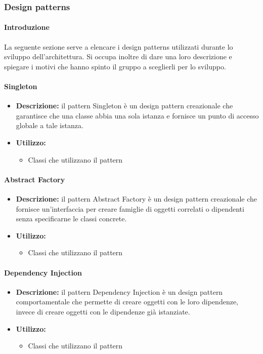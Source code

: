 \subsubsection{Design patterns}
\paragraph{Introduzione}
\par La seguente sezione serve a elencare i design patterns utilizzati durante lo sviluppo dell'architettura. Si occupa inoltre di dare una loro descrizione e spiegare i motivi che hanno spinto il gruppo a sceglierli per lo sviluppo.

\paragraph{Singleton}
\begin{itemize}
    \item{\textbf{Descrizione:}} il pattern Singleton è un design pattern creazionale che garantisce che una classe abbia una sola istanza e fornisce un punto di accesso globale a tale istanza.
    \item{\textbf{Utilizzo:}}
    \begin{itemize}
        \item Classi che utilizzano il pattern
    \end{itemize}
\end{itemize}

\paragraph{Abstract Factory}
\begin{itemize}
    \item{\textbf{Descrizione:}} il pattern Abstract Factory è un design pattern creazionale che fornisce un'interfaccia per creare famiglie di oggetti correlati o dipendenti senza specificarne le classi concrete.
    \item{\textbf{Utilizzo:}}
    \begin{itemize}
        \item Classi che utilizzano il pattern
    \end{itemize}
\end{itemize}

\paragraph{Dependency Injection}
\begin{itemize}
    \item{\textbf{Descrizione:}} il pattern Dependency Injection è un design pattern comportamentale che permette di creare oggetti con le loro dipendenze, invece di creare oggetti con le dipendenze già istanziate.
    \item{\textbf{Utilizzo:}}
    \begin{itemize}
        \item Classi che utilizzano il pattern
    \end{itemize}
\end{itemize}

